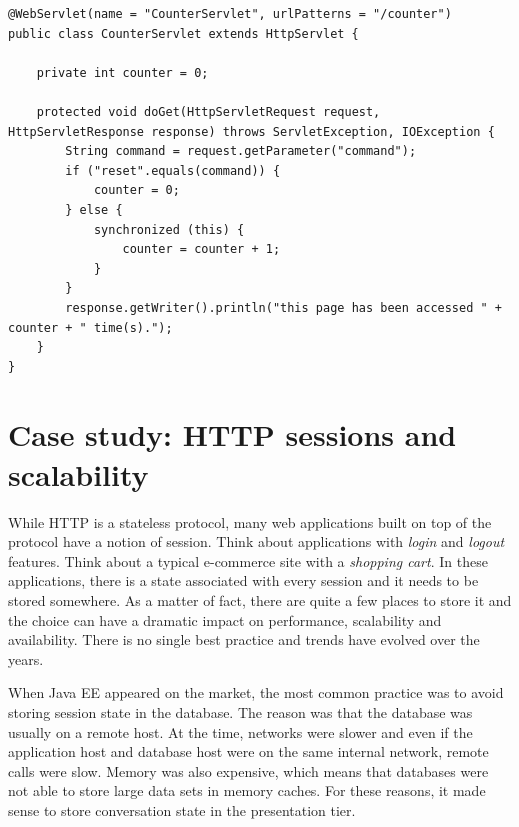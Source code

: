 \vspace{10pt}
\begin{minipage}{\linewidth}
\begin{lstlisting}[frame=single]
@WebServlet(name = "CounterServlet", urlPatterns = "/counter")
public class CounterServlet extends HttpServlet {

    private int counter = 0;

    protected void doGet(HttpServletRequest request, HttpServletResponse response) throws ServletException, IOException {
        String command = request.getParameter("command");
        if ("reset".equals(command)) {
            counter = 0;
        } else {
            synchronized (this) {
                counter = counter + 1;
            }
        }
        response.getWriter().println("this page has been accessed " + counter + " time(s).");
    }
}
\end{lstlisting}
\end{minipage}

\section{Case study: HTTP sessions and scalability}

While HTTP is a stateless protocol, many web applications built on top of the protocol have a notion of session. Think about applications with \emph{login} and \emph{logout} features. Think about a typical e-commerce site with a \emph{shopping cart}. In these applications, there is a state associated with every session and it needs to be stored somewhere. As a matter of fact, there are quite a few places to store it and the choice can have a dramatic impact on performance, scalability and availability. There is no single best practice and trends have evolved over the years.

When Java EE appeared on the market, the most common practice was to avoid storing session state in the database. The reason was that the database was usually on a remote host. At the time, networks were slower and even if the application host and database host were on the same internal network, remote calls were slow. Memory was also expensive, which means that databases were not able to store large data sets in memory caches. For these reasons, it made sense to store conversation state in the presentation tier.

